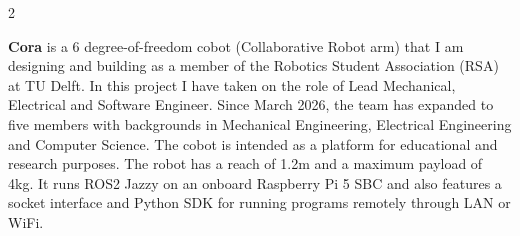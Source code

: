 \documentclass[9pt, a4paper, withhyper]{altacv}
\begin{document}
   


  \makecvheader


  \begin{paracol}
    {2}





    
     {}    
    \textbf{Cora} is a 6 degree-of-freedom cobot (Collaborative Robot arm) that I am
    designing and building as a member of the Robotics Student Association (RSA)
    at TU Delft. In this project I have taken on the role of Lead Mechanical,
    Electrical and Software Engineer. Since March 2026, the team has expanded 
    to five members with backgrounds in Mechanical Engineering, 
    Electrical Engineering and Computer Science.
    The cobot is intended as a platform for educational and research purposes.
    The robot has a reach of 1.2m and a maximum payload of 4kg.
    It runs ROS2 Jazzy on an onboard Raspberry Pi 5 SBC
    and also features a socket interface and Python SDK for running programs 
    remotely through LAN or WiFi.
    

\end{paracol}
\end{document}
